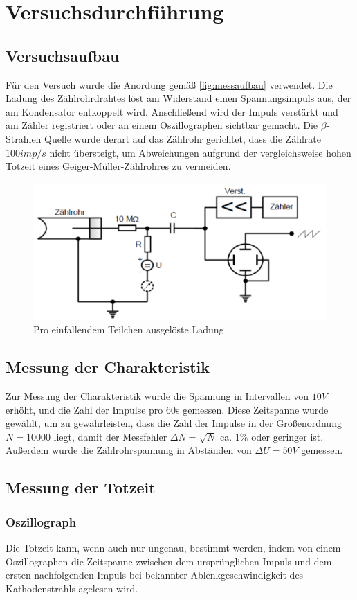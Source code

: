 \section{Versuchsdurchführung}
\subsection{Versuchsaufbau}
Für den Versuch wurde die Anordung gemäß \autoref{fig:messaufbau} verwendet. Die Ladung des Zählrohrdrahtes löst am 
Widerstand einen Spannungsimpuls aus, der am Kondensator entkoppelt wird. Anschließend wird der Impuls 
verstärkt und am Zähler registriert oder an einem Oszillographen sichtbar gemacht. Die $\beta$-Strahlen 
Quelle wurde derart auf das Zählrohr gerichtet, dass die Zählrate $100imp/s$ nicht übersteigt, um 
Abweichungen aufgrund der vergleichsweise hohen Totzeit eines Geiger-Müller-Zählrohres zu vermeiden.
\begin{figure}
    \centering
    \includegraphics{Messaufbau.pdf}
    \caption{Pro einfallendem Teilchen ausgelöste Ladung}
    \label{fig:messaufbau}
  \end{figure}
\subsection{Messung der Charakteristik}
Zur Messung der Charakteristik wurde die Spannung in Intervallen von $10V$ erhöht, und die Zahl der Impulse 
pro 60s gemessen. Diese Zeitspanne wurde gewählt, um zu gewährleisten, dass die Zahl der Impulse in der 
Größenordnung $N=10000$  liegt, damit der Messfehler $\Delta N=\sqrt{N}$ ca. 1\% oder geringer ist. 
Außerdem wurde die Zählrohrspannung in Abständen von $\Delta U=50V$ gemessen.
\subsection{Messung der Totzeit}
\subsubsection{Oszillograph}
Die Totzeit kann, wenn auch nur ungenau, bestimmt werden, indem von einem Oszillographen die Zeitspanne 
zwischen dem ursprünglichen Impuls und dem ersten nachfolgenden Impuls bei bekannter Ablenkgeschwindigkeit 
des Kathodenstrahls agelesen wird.
